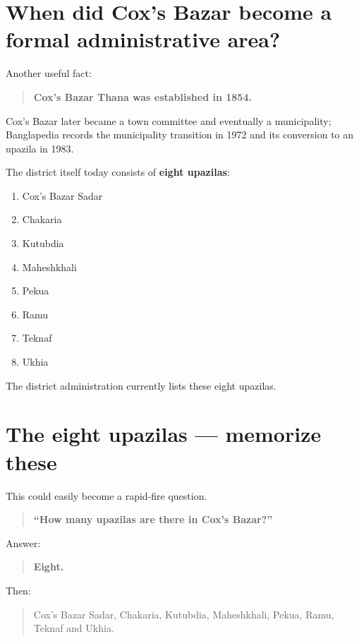 \section{When did Cox's Bazar become a formal administrative area?}

Another useful fact:

\begin{quote}
\textbf{Cox's Bazar Thana was established in 1854.}\\
\end{quote}

Cox's Bazar later became a town committee and eventually a municipality; Banglapedia records the municipality transition in 1972 and its conversion to an upazila in 1983.

The district itself today consists of \textbf{eight upazilas}:

\begin{enumerate}
  \item Cox's Bazar Sadar
  \item Chakaria
  \item Kutubdia
  \item Maheshkhali
  \item Pekua
  \item Ramu
  \item Teknaf
  \item Ukhia
\end{enumerate}

The district administration currently lists these eight upazilas.

\medskip

\section{The eight upazilas --- memorize these}

This could easily become a rapid-fire question.

\begin{quote}
\textbf{``How many upazilas are there in Cox's Bazar?''}\\
\end{quote}

Answer:

\begin{quote}
\textbf{Eight.}\\
\end{quote}

Then:

\begin{quote}
Cox's Bazar Sadar, Chakaria, Kutubdia, Maheshkhali, Pekua, Ramu, Teknaf and Ukhia.\\
\end{quote}

